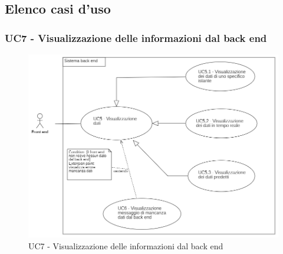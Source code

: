 \subsection{Elenco casi d'uso}\label{CasiDUsoCasiDUsoTraIlFrontEndEIlBackEndElencoDeiCasiDUso}


\subsubsection{UC7 - Visualizzazione delle informazioni dal back end}\label{CasiDUsoCasiDUsoTraIlFrontEndEIlBackEndElencoDeiCasiDUsoUC7VisualizzazioneDelleInformazioniDalBackEnd}
\begin{center}
	\begin{figure}[H]
		\includegraphics[scale=0.7]{../immagini/attori_casi/uc5_uc51_uc52_uc53.png}
		\caption{UC7 - Visualizzazione delle informazioni dal back end}
	\end{figure}
\end{center}
